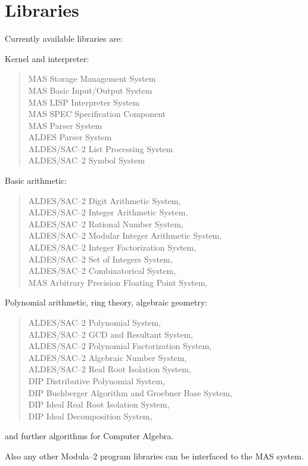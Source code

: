 \section{Libraries}

Currently available libraries are:

Kernel and interpreter:
\begin{quote}
\begin{obeylines} 
  MAS          Storage Management System
  MAS          Basic Input/Output System 
  MAS          LISP Interpreter System
  MAS          SPEC Specification Component
  MAS          Parser System 
  ALDES        Parser System 
  ALDES/SAC--2 List Processing System
  ALDES/SAC--2 Symbol System
\end{obeylines}

\end{quote}

Basic arithmetic:
\begin{quote}
\begin{obeylines} 
  ALDES/SAC--2 Digit Arithmetic System,
  ALDES/SAC--2 Integer Arithmetic System,
  ALDES/SAC--2 Rational Number System,
  ALDES/SAC--2 Modular Integer Arithmetic System, 
  ALDES/SAC--2 Integer Factorization System, 
  ALDES/SAC--2 Set of Integers System, 
  ALDES/SAC--2 Combinatorical System, 
  MAS          Arbitrary Precision Floating Point System, 
\end{obeylines}
\end{quote}

Polynomial arithmetic, ring theory, algebraic geometry:
\begin{quote}
\begin{obeylines}
  ALDES/SAC--2 Polynomial System,
  ALDES/SAC--2 GCD and Resultant System,
  ALDES/SAC--2 Polynomial Factorization System,
  ALDES/SAC--2 Algebraic Number System,
  ALDES/SAC--2 Real Root Isolation System,
  DIP          Distributive Polynomial System,
  DIP          Buchberger Algorithm and Groebner Base System,
  DIP          Ideal Real Root Isolation System,
  DIP          Ideal Decomposition System,
\end{obeylines}
\end{quote}

and further algorithms for Computer Algebra.

Also any other Modula--2 program libraries can be interfaced 
to the MAS system.

